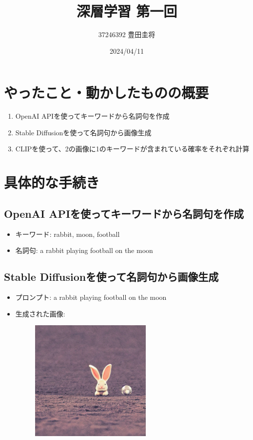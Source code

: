 \documentclass{ltjsarticle}
\title{深層学習 第一回}
\author{37246392 豊田圭将}
\date{2024/04/11}
\begin{document}
\maketitle

\section{やったこと・動かしたものの概要}

\begin{enumerate}
  \item OpenAI APIを使ってキーワードから名詞句を作成
  \item Stable Diffusionを使って名詞句から画像生成
  \item CLIPを使って、2の画像に1のキーワードが含まれている確率をそれぞれ計算
\end{enumerate}

\section{具体的な手続き}

\subsection{OpenAI APIを使ってキーワードから名詞句を作成}
\begin{itemize}
  \item キーワード: rabbit, moon, football
  \item 名詞句: a rabbit playing football on the moon
\end{itemize}

\subsection{Stable Diffusionを使って名詞句から画像生成}
\begin{itemize}
  \item プロンプト: a rabbit playing football on the moon
  \item 生成された画像: \\

        \begin{figure}[H]
          \centering
          \includegraphics[width=6cm]{a_rabbit_playing_football_on_the_moon.png}
        \end{figure}
\end{itemize}
\end{document}
